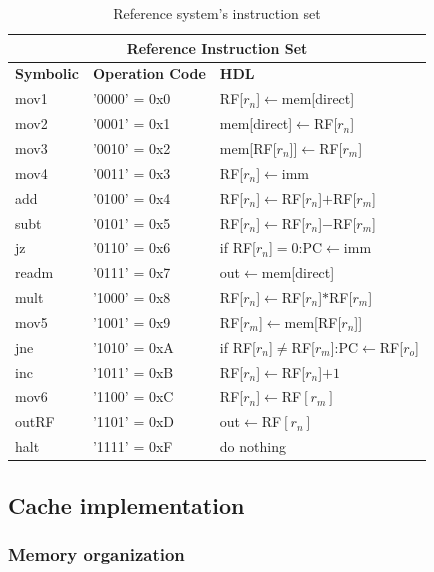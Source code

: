 \documentclass[]{article}
\begin{document}
\begin{table}[!ht]
	\centering
	{
	\begin{tabular}{|p{1.5cm}|p{2.8cm}|p{4.7cm}|}
		\hline
		\multicolumn{3}{|c|}{\textbf{Reference Instruction Set}} \\
		\hline
		\textbf{Symbolic} & \textbf{Operation Code} & \textbf{HDL} \\
		\hline
		mov1 & '0000' = 0x0 & RF[$r_n$]$\leftarrow$mem[direct]\\
		mov2 & '0001' = 0x1 & mem[direct]$\leftarrow$RF[$r_n$]\\
		mov3 & '0010' = 0x2 & mem[RF[$r_n$]]$\leftarrow$RF[$r_m$]\\
		mov4 & '0011' = 0x3 & RF[$r_n$]$\leftarrow$imm\\
		add & '0100' = 0x4 & RF[$r_n$]$\leftarrow$RF[$r_n$]$+$RF[$r_m$]\\
		subt & '0101' = 0x5 & RF[$r_n$]$\leftarrow$RF[$r_n$]$-$RF[$r_m$]\\
		jz & '0110' = 0x6 & if RF[$r_n$]$=0$:PC$\leftarrow$imm\\
		readm & '0111' = 0x7 & out$\leftarrow$mem[direct]\\
		mult & '1000' = 0x8 & RF[$r_n$]$\leftarrow$RF[$r_n$]$*$RF[$r_m$]\\
		mov5 & '1001' = 0x9 & RF[$r_m$]$\leftarrow$mem[RF[$r_n$]]\\
		jne & '1010' = 0xA & if RF[$r_n$]$\neq$RF[$r_m$]:PC$\leftarrow$RF[$r_o$]\\
		inc & '1011' = 0xB & RF[$r_n$]$\leftarrow$RF[$r_n$]$+1$\\
		mov6 & '1100' = 0xC & RF[$r_n$]$\leftarrow$RF$[r_m]$ \\
		outRF & '1101' = 0xD & out$\leftarrow$RF$[r_n]$ \\
		halt & '1111' = 0xF & do nothing \\
		\hline
	\end{tabular}
	}
	\caption{Reference system's instruction set}
	\label{tab:2}
\end{table}

\subsection{Cache implementation}

\subsubsection{Memory organization}
\end{document}
